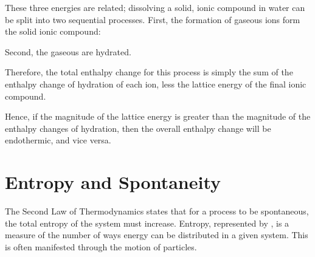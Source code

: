				These three energies are related; dissolving a solid, ionic compound in water can be split into two sequential processes.
				First, the formation of gaseous ions form the solid ionic compound:


				Second, the gaseous are hydrated.


				Therefore, the total enthalpy change for this process is simply the sum of the enthalpy change of hydration of each ion, less
				the lattice energy of the final ionic compound.

				\eqndiagram{
					\[ \Delta H_{sol} = \sum{}\Delta H_{hyd} - LE \]
				}

				Hence, if the magnitude of the lattice energy is greater than the magnitude of the enthalpy changes of hydration, then the
				overall enthalpy change will be endothermic, and vice versa.





	\pagebreak
	\section{Entropy and Spontaneity}

		The Second Law of Thermodynamics states that for a process to be spontaneous, the total entropy of the system must increase. Entropy,
		represented by , is a measure of the number of ways energy can be distributed in a given system. This is often manifested through
		the motion of particles.

